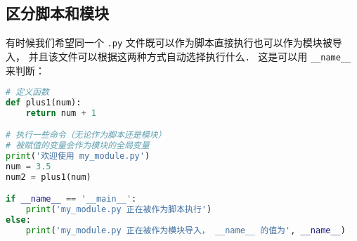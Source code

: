 
\subsection{区分脚本和模块}
有时候我们希望同一个 \verb|.py| 文件既可以作为脚本直接执行也可以作为模块被导入， 并且该文件可以根据这两种方式自动选择执行什么． 这是可以用 \verb|__name__| 来判断：
\begin{lstlisting}[language=python, caption=my\_module.py]
# 定义函数
def plus1(num):
    return num + 1

# 执行一些命令（无论作为脚本还是模块）
# 被赋值的变量会作为模块的全局变量
print('欢迎使用 my_module.py')
num = 3.5
num2 = plus1(num)

if __name__ == '__main__':
    print('my_module.py 正在被作为脚本执行')
else:
    print('my_module.py 正在被作为模块导入， __name__ 的值为', __name__)
\end{lstlisting}

